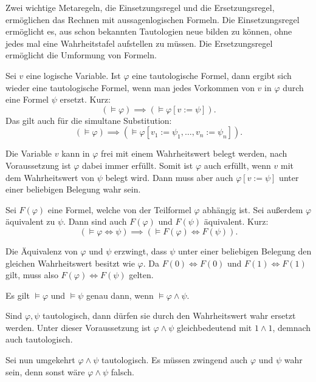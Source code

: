 Zwei wichtige Metaregeln, die Einsetzungsregel und die
Ersetzungsregel, ermöglichen das Rechnen mit aussagenlogischen
Formeln. Die Einsetzungsregel ermöglicht es, aus schon bekannten
Tautologien neue bilden zu können, ohne jedes mal eine Wahrheitstafel
aufstellen zu müssen. Die Ersetzungsregel ermöglicht die Umformung
von Formeln.

\begin{Satz}[Einsetzungsregel]
Sei $v$ eine logische Variable. Ist $\varphi$ eine tautologische
Formel, dann ergibt sich wieder eine tautologische Formel, wenn man
jedes Vorkommen von $v$ in $\varphi$ durch eine Formel $\psi$ ersetzt.
Kurz:
\[(\models \varphi )\implies (\models \varphi [v:=\psi]).\]
Das gilt auch für die simultane Substitution:
\[(\models \varphi )\implies
(\models \varphi [v_1:=\psi_1,\ldots ,v_n:=\psi_n]).\]
\end{Satz}
 Die Variable $v$ kann in $\varphi$
frei mit einem Wahrheitswert belegt werden, nach Voraussetzung
ist $\varphi$ dabei immer erfüllt. Somit ist $\varphi$ auch
erfüllt, wenn $v$ mit dem Wahrheitswert von $\psi$ belegt wird.
Dann muss aber auch $\varphi[v:=\psi]$ unter einer beliebigen Belegung
wahr sein.\;\qedsymbol

\newpage
\begin{Satz}[Ersetzungsregel]%
\label{Ersetzungsregel}
Sei $F(\varphi)$ eine Formel, welche von der Teilformel $\varphi$
abhängig ist. Sei außerdem $\varphi$ äquivalent zu $\psi$.
Dann sind auch $F(\varphi)$ und $F(\psi)$ äquivalent. Kurz:
\[(\models\varphi\Leftrightarrow\psi)
\implies (\models F(\varphi)\Leftrightarrow F(\psi)).\]
\end{Satz}
Die Äquivalenz von $\varphi$ und $\psi$ erzwingt, dass $\psi$
unter einer beliebigen Belegung den gleichen Wahrheitswert besitzt
wie $\varphi$. Da $F(0)\Leftrightarrow F(0)$ und
$F(1)\Leftrightarrow F(1)$ gilt, muss also
$F(\varphi)\Leftrightarrow F(\psi)$ gelten.\;\qedsymbol

\begin{Satz}
Es gilt $\models\varphi$ und $\models\psi$
genau dann, wenn $\models\varphi\land\psi$.
\end{Satz}
Sind $\varphi,\psi$ tautologisch, dann dürfen sie durch
den Wahrheitswert wahr ersetzt werden. Unter dieser Voraussetzung
ist $\varphi\land\psi$ gleichbedeutend mit $1\land 1$, demnach
auch tautologisch.

Sei nun umgekehrt $\varphi\land\psi$ tautologisch. Es müssen
zwingend auch $\varphi$ und $\psi$ wahr sein, denn sonst wäre
$\varphi\land\psi$ falsch.\;\qedsymbol

